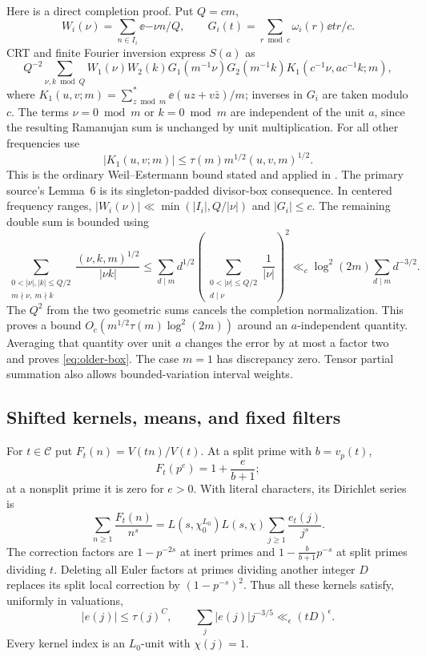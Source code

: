 Here is a direct completion proof.  Put \(Q=cm\),
\[
 W_i(\nu)=\sum_{n\in I_i}\ee{-\nu n/Q},\qquad
 G_i(t)=\sum_{r\bmod c}\omega_i(r)\ee{tr/c}.
\]
CRT and finite Fourier inversion express \(S(a)\) as
\[
 Q^{-2}\sum_{\nu,k\bmod Q}
 W_1(\nu)W_2(k)G_1(m^{-1}\nu)G_2(m^{-1}k)
       K_1(c^{-1}\nu,ac^{-1}k;m),
\]
where \(K_1(u,v;m)=\sum_{z\bmod m}^{*}\ee{(uz+v\bar z)/m}\);
inverses in \(G_i\) are taken modulo \(c\).
The terms \(\nu=0\bmod m\) or \(k=0\bmod m\) are independent of
the unit \(a\), since the resulting Ramanujan sum is unchanged by
unit multiplication.  For all other frequencies use
\[
 |K_1(u,v;m)|\le\tau(m)m^{1/2}(u,v,m)^{1/2}.
\]
This is the ordinary Weil--Estermann bound stated and applied in
\cite[printed p.~44]{heathbrown}.  The primary source's
Lemma~6 is its singleton-padded divisor-box consequence.
In centered frequency ranges,
\(|W_i(\nu)|\ll\min(|I_i|,Q/|\nu|)\) and \(|G_i|\le c\).
The remaining double sum is bounded using
\[
 \sum_{\substack{0<|\nu|,|k|\le Q/2\\m\nmid \nu,\ m\nmid k}}
      \frac{(\nu,k,m)^{1/2}}{|\nu k|}
 \le \sum_{d\mid m}d^{1/2}
       \left(\sum_{\substack{0<|\nu|\le Q/2\\d\mid \nu}}\frac1{|\nu|}\right)^2
 \ll_c \log^2(2m)\sum_{d\mid m}d^{-3/2}.
\]
The \(Q^2\) from the two geometric sums cancels the completion
normalization.  This proves a bound
\(O_c(m^{1/2}\tau(m)\log^2(2m))\) around an \(a\)-independent
quantity.  Averaging that quantity over unit \(a\) changes the
error by at most a factor two and proves \eqref{eq:older-box}.
The case \(m=1\) has discrepancy zero.
Tensor partial summation also allows bounded-variation interval weights.

\subsection{Shifted kernels, means, and fixed filters}

For \(t\in\mathcal C\) put \(F_t(n)=V(tn)/V(t)\).
At a split prime with \(b=v_p(t)\),
\[
 F_t(p^e)=1+\frac{e}{b+1};
\]
at a nonsplit prime it is zero for \(e>0\).
With literal characters, its Dirichlet series is
\[
 \sum_{n\ge1}\frac{F_t(n)}{n^s}
   =L(s,\chi_0^{L_0})L(s,\chi)\sum_{j\ge1}\frac{e_t(j)}{j^s}.
\]
The correction factors are \(1-p^{-2s}\) at inert primes and
\(1-\frac{b}{b+1}p^{-s}\) at split primes dividing \(t\).
Deleting all Euler factors at primes dividing another integer \(D\)
replaces its split local correction by \((1-p^{-s})^2\).
Thus all these kernels satisfy, uniformly in valuations,
\begin{equation}\label{eq:older-kernel}
 |e(j)|\le\tau(j)^C,\qquad
 \sum_j|e(j)|j^{-3/5}\ll_{\epsilon}(tD)^\epsilon.
\end{equation}
Every kernel index is an \(L_0\)-unit with \(\chi(j)=1\).

